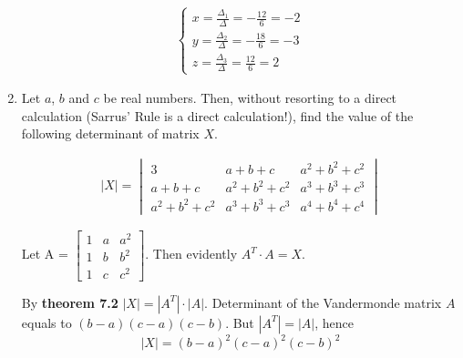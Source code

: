 \documentclass{article}
\begin{document}
\begin{enumerate}
\begin{align*}
\begin{cases}
x=\frac{\Delta_1}{\Delta}=-\frac{12}{6}=-2\\
y=\frac{\Delta_2}{\Delta}=-\frac{18}{6}=-3\\
z=\frac{\Delta_3}{\Delta}=\frac{12}{6}=2
\end{cases}
\end{align*}

\item Let $a$, $b$ and $c$ be real numbers. Then, without resorting to a direct calculation (Sarrus’ Rule is
a direct calculation!), find the value of the following determinant of matrix $X$.

\begin{align*}
|X|=\begin{vmatrix}
3&a+b+c&a^2+b^2+c^2\\
a+b+c&a^2+b^2+c^2&a^3+b^3+c^3\\
a^2+b^2+c^2&a^3+b^3+c^3&a^4+b^4+c^4
\end{vmatrix}
\end{align*}

Let A = $\begin{bmatrix}
1&a&a^2\\
1&b&b^2\\
1&c&c^2
\end{bmatrix}$. Then evidently $A^T \cdot A = X$. 

By \textbf{theorem 7.2} $|X|=|A^T|\cdot|A|$. Determinant of the Vandermonde matrix $A$ equals to $(b-a)(c-a)(c-b)$. But $|A^T|=|A|$, hence 
\[|X|=(b-a)^2(c-a)^2(c-b)^2\]

\end{enumerate}
\end{document}

